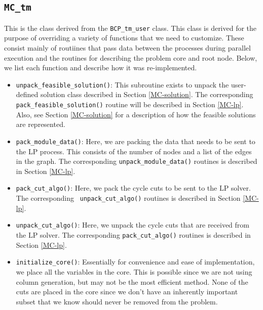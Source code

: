 \subsection{\tt MC\_tm}
\label{MC-tm}

This is the class derived from the {\tt BCP\_tm\_user} class. This
class is derived for the purpose of overriding a variety of functions
that we need to customize. These consist mainly of routiines that pass
data between the processes during parallel execution and the routines
for describing the problem core and root node. Below, we list each
function and describe how it was re-implemented.

\begin{itemize}

        \item {\tt unpack\_feasible\_solution()}: This subroutine
        exists to unpack the user-defined solution class described in
        Section \ref{MC-solution}. The corresponding {\tt
        pack\_feasible\_solution()} routine will be described in
        Section \ref{MC-lp}. Also, see Section \ref{MC-solution} for a
        description of how the feasible solutions are represented.
        
        \item {\tt pack\_module\_data()}: Here, we are packing the
        data that needs to be sent to the LP process. This consists of
        the number of nodes and a list of the edges in the graph. The
        corresponding {\tt unpack\_module\_data()} routines is
        described in Section \ref{MC-lp}.

        \item {\tt pack\_cut\_algo()}: Here, we pack the cycle cuts to
        be sent to the LP solver. The corresponding {\tt
        unpack\_cut\_algo()} routines is described in Section
        \ref{MC-lp}.

        \item {\tt unpack\_cut\_algo()}: Here, we unpack the cycle
        cuts that are received from the LP solver. The corresponding
        {\tt pack\_cut\_algo()} routines is described in Section
        \ref{MC-lp}.

        \item {\tt initialize\_core()}: Essentially for convenience
        and ease of implementation, we place all the variables in the
        core. This is possible since we are not using column
        generation, but may not be the most efficient method. None of
        the cuts are placed in the core since we don't have an
        inherently important subset that we know should never be
        removed from the problem.


\end{itemize}
